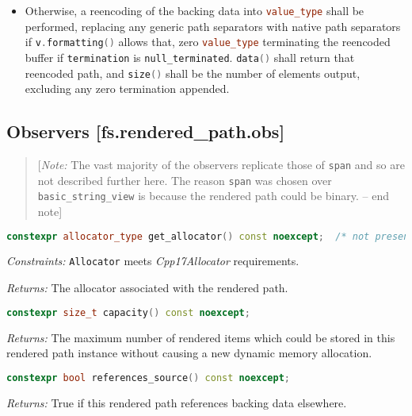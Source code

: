 \documentclass[11pt]{article}
\newcommand{\code}[2][cpp]{\lstinline[language=#1,basicstyle=\small\ttfamily]{#2}}
\newcommand{\desc}[1]{\textit{#1}}
\newcommand{\constraints}{\desc{Constraints: }}
\newcommand{\returns}{\desc{Returns: }}
\newcommand{\note}[1]{\begin{quote}[\textit{Note:} #1 -- end note]\end{quote}}
\begin{document}
\begin{itemize}
    \item Otherwise, a reencoding of the backing data into \code{value_type} shall be performed, replacing any generic path separators with native path separators if \code{v.formatting()} allows that, zero \code{value_type} terminating the reencoded buffer if \code{termination} is \code{null_terminated}. \code{data()} shall return that reencoded path, and \code{size()} shall be the number of elements output, excluding any zero termination appended.

\end{itemize}

\subsection*{Observers [fs.rendered\_path.obs]}

\color{black}

\note{The vast majority of the observers replicate those of \code{span} and so are not described further here. The reason \code{span} was chosen over \code{basic_string_view} is because the rendered path could be binary.}

\color{darkgreen}

\begin{lstlisting}[language=cpp]
    constexpr allocator_type get_allocator() const noexcept;  /* not present if default_rendered_path_allocator tag type was used */
\end{lstlisting}

\constraints \code{Allocator} meets \emph{Cpp17Allocator} requirements.

\returns The allocator associated with the rendered path.\\


\begin{lstlisting}[language=cpp]
    constexpr size_t capacity() const noexcept;
\end{lstlisting}

\returns The maximum number of rendered items which could be stored in this rendered path instance without causing a new dynamic memory allocation.\\


\begin{lstlisting}[language=cpp]
    constexpr bool references_source() const noexcept;
\end{lstlisting}

\returns True if this rendered path references backing data elsewhere.\\
\end{document}
